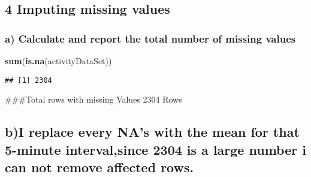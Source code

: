 \documentclass[
]{article}
\newenvironment{Shaded}{\begin{snugshade}}{\end{snugshade}}
\newcommand{\ControlFlowTok}[1]{\textcolor[rgb]{0.13,0.29,0.53}{\textbf{#1}}}
\newcommand{\DecValTok}[1]{\textcolor[rgb]{0.00,0.00,0.81}{#1}}
\newcommand{\KeywordTok}[1]{\textcolor[rgb]{0.13,0.29,0.53}{\textbf{#1}}}
\newcommand{\NormalTok}[1]{#1}
\newcommand{\OperatorTok}[1]{\textcolor[rgb]{0.81,0.36,0.00}{\textbf{#1}}}
\newcommand{\StringTok}[1]{\textcolor[rgb]{0.31,0.60,0.02}{#1}}
\begin{document}
\hypertarget{imputing-missing-values}{%
\subsection{4 Imputing missing values}\label{imputing-missing-values}}

\hypertarget{a-calculate-and-report-the-total-number-of-missing-values}{%
\subsubsection{a) Calculate and report the total number of missing
values}\label{a-calculate-and-report-the-total-number-of-missing-values}}

\begin{Shaded}
\begin{Highlighting}[]
\KeywordTok{sum}\NormalTok{(}\KeywordTok{is.na}\NormalTok{(activityDataSet))}
\end{Highlighting}
\end{Shaded}

\begin{verbatim}
## [1] 2304
\end{verbatim}

\#\#\#Total rows with missing Values 2304 Rows

\hypertarget{bi-replace-every-nas-with-the-mean-for-that-5-minute-intervalsince-2304-is-a-large-number-i-can-not-remove-affected-rows.}{%
\subsection{b)I replace every NA's with the mean for that 5-minute
interval,since 2304 is a large number i can not remove affected
rows.}\label{bi-replace-every-nas-with-the-mean-for-that-5-minute-intervalsince-2304-is-a-large-number-i-can-not-remove-affected-rows.}}

\begin{Shaded}
\end{Shaded}
\end{document}
